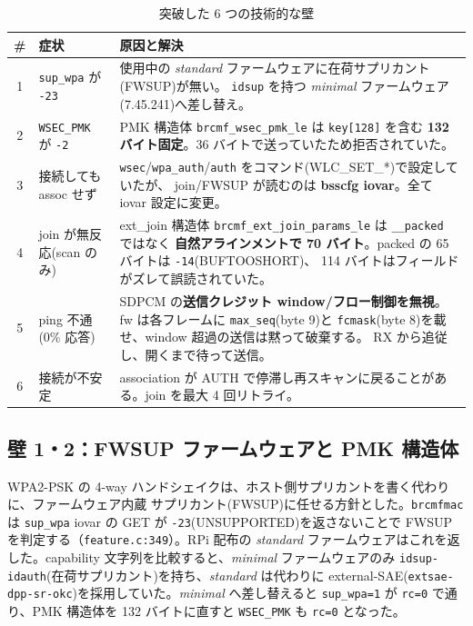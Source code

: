 \documentclass[a4paper,11pt]{ltjsarticle}
\begin{document}
\begin{table}[h]
\centering
\caption{突破した 6 つの技術的な壁}
\label{tab:walls}
\small
\begin{tabular}{@{}clp{8.4cm}@{}}
\toprule
\# & 症状 & 原因と解決 \\
\midrule
1 & \texttt{sup\_wpa} が \texttt{-23} & 使用中の \emph{standard} ファームウェアに在荷サプリカント(FWSUP)が無い。
   \texttt{idsup} を持つ \emph{minimal} ファームウェア(7.45.241)へ差し替え。\\
2 & \texttt{WSEC\_PMK} が \texttt{-2} & PMK 構造体 \texttt{brcmf\_wsec\_pmk\_le} は \texttt{key[128]} を含む
   \textbf{132 バイト固定}。36 バイトで送っていたため拒否されていた。\\
3 & 接続しても assoc せず & \texttt{wsec}/\texttt{wpa\_auth}/\texttt{auth} をコマンド(WLC\_SET\_*)で設定していたが、
   join/FWSUP が読むのは \textbf{bsscfg iovar}。全て iovar 設定に変更。\\
4 & join が無反応(scan のみ) & ext\_join 構造体 \texttt{brcmf\_ext\_join\_params\_le} は \texttt{\_\_packed} ではなく
   \textbf{自然アラインメントで 70 バイト}。packed の 65 バイトは \texttt{-14}(BUFTOOSHORT)、
   114 バイトはフィールドがズレて誤読されていた。\\
5 & ping 不通(0\% 応答) & SDPCM の\textbf{送信クレジット window/フロー制御を無視}。fw は各フレームに
   \texttt{max\_seq}(byte 9)と \texttt{fcmask}(byte 8)を載せ、window 超過の送信は黙って破棄する。
   RX から追従し、開くまで待って送信。\\
6 & 接続が不安定 & association が AUTH で停滞し再スキャンに戻ることがある。join を最大 4 回リトライ。\\
\bottomrule
\end{tabular}
\end{table}

\subsection{壁 1・2：FWSUP ファームウェアと PMK 構造体}
WPA2-PSK の 4-way ハンドシェイクは、ホスト側サプリカントを書く代わりに、ファームウェア内蔵
サプリカント(FWSUP)に任せる方針とした。\texttt{brcmfmac} は \texttt{sup\_wpa} iovar の GET が
\texttt{-23}(UNSUPPORTED)を返さないことで FWSUP を判定する（\texttt{feature.c:349}）。RPi 配布の
\emph{standard} ファームウェアはこれを返した。capability 文字列を比較すると、\emph{minimal}
ファームウェアのみ \texttt{idsup-idauth}(在荷サプリカント)を持ち、\emph{standard} は代わりに
external-SAE(\texttt{extsae-dpp-sr-okc})を採用していた。\emph{minimal} へ差し替えると
\texttt{sup\_wpa=1} が \texttt{rc=0} で通り、PMK 構造体を 132 バイトに直すと \texttt{WSEC\_PMK} も
\texttt{rc=0} となった。
\end{document}
